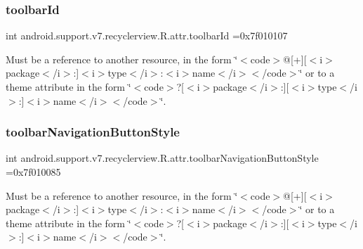 \subsubsection{\texorpdfstring{toolbar\+Id}{toolbarId}}
{\footnotesize\ttfamily int android.\+support.\+v7.\+recyclerview.\+R.\+attr.\+toolbar\+Id =0x7f010107\hspace{0.3cm}{\ttfamily [static]}}

Must be a reference to another resource, in the form \char`\"{}$<$code$>$@\mbox{[}+\mbox{]}\mbox{[}$<$i$>$package$<$/i$>$\+:\mbox{]}$<$i$>$type$<$/i$>$\+:$<$i$>$name$<$/i$>$$<$/code$>$\char`\"{} or to a theme attribute in the form \char`\"{}$<$code$>$?\mbox{[}$<$i$>$package$<$/i$>$\+:\mbox{]}\mbox{[}$<$i$>$type$<$/i$>$\+:\mbox{]}$<$i$>$name$<$/i$>$$<$/code$>$\char`\"{}. \mbox{\label{classandroid_1_1support_1_1v7_1_1recyclerview_1_1R_1_1attr_a47fb36cb5b950c9e5f374ea86d000d70}} 
\subsubsection{\texorpdfstring{toolbar\+Navigation\+Button\+Style}{toolbarNavigationButtonStyle}}
{\footnotesize\ttfamily int android.\+support.\+v7.\+recyclerview.\+R.\+attr.\+toolbar\+Navigation\+Button\+Style =0x7f010085\hspace{0.3cm}{\ttfamily [static]}}

Must be a reference to another resource, in the form \char`\"{}$<$code$>$@\mbox{[}+\mbox{]}\mbox{[}$<$i$>$package$<$/i$>$\+:\mbox{]}$<$i$>$type$<$/i$>$\+:$<$i$>$name$<$/i$>$$<$/code$>$\char`\"{} or to a theme attribute in the form \char`\"{}$<$code$>$?\mbox{[}$<$i$>$package$<$/i$>$\+:\mbox{]}\mbox{[}$<$i$>$type$<$/i$>$\+:\mbox{]}$<$i$>$name$<$/i$>$$<$/code$>$\char`\"{}. \mbox{\label{classandroid_1_1support_1_1v7_1_1recyclerview_1_1R_1_1attr_aefd9069784f7d350aa927b9fcb98e4e8}} 
